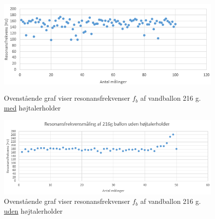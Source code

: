{\begin{figure}[htbp]
  \begin{minipage}[b]{1\linewidth}
    \centering
    \includegraphics[width=\linewidth]{ballon216g(m_holder)}
    \caption{Ovenstående graf viser resonansfrekvenser $f_{b}$  af vandballon 216 g. \underline{med} højtalerholder}
    \label{fig:ballon216g(m_holder)}
  \end{minipage}
  \hspace{1cm}
  \begin{minipage}[b]{1\linewidth}
    \centering
    \includegraphics[width=\linewidth]{ballon216g(u_holder)}
    \caption{Ovenstående graf viser resonansfrekvenser $f_{b}$  af vandballon 216 g. \underline{uden} højtalerholder}
    \label{fig:ballon216g(u_holder)}
  \end{minipage}
\end{figure}

}
